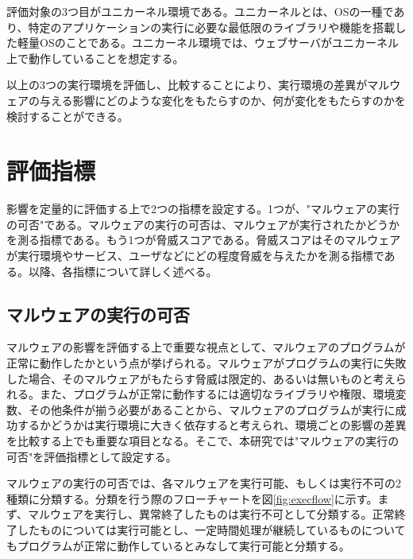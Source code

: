 \documentclass[12pt,a4paper,titlepage,report]{jsbook}
\begin{document}
評価対象の3つ目がユニカーネル環境である。ユニカーネルとは、OSの一種であり、特定のアプリケーションの実行に必要な最低限のライブラリや機能を搭載した軽量OSのことである。ユニカーネル環境では、ウェブサーバがユニカーネル上で動作していることを想定する。

以上の3つの実行環境を評価し、比較することにより、実行環境の差異がマルウェアの与える影響にどのような変化をもたらすのか、何が変化をもたらすのかを検討することができる。

\section{評価指標}
影響を定量的に評価する上で2つの指標を設定する。1つが、"マルウェアの実行の可否"である。マルウェアの実行の可否は、マルウェアが実行されたかどうかを測る指標である。もう1つが脅威スコアである。脅威スコアはそのマルウェアが実行環境やサービス、ユーザなどにどの程度脅威を与えたかを測る指標である。以降、各指標について詳しく述べる。

\subsection{マルウェアの実行の可否}
マルウェアの影響を評価する上で重要な視点として、マルウェアのプログラムが正常に動作したかという点が挙げられる。マルウェアがプログラムの実行に失敗した場合、そのマルウェアがもたらす脅威は限定的、あるいは無いものと考えられる。また、プログラムが正常に動作するには適切なライブラリや権限、環境変数、その他条件が揃う必要があることから、マルウェアのプログラムが実行に成功するかどうかは実行環境に大きく依存すると考えられ、環境ごとの影響の差異を比較する上でも重要な項目となる。そこで、本研究では"マルウェアの実行の可否"を評価指標として設定する。

マルウェアの実行の可否では、各マルウェアを実行可能、もしくは実行不可の2種類に分類する。分類を行う際のフローチャートを図\ref{fig:execflow}に示す。まず、マルウェアを実行し、異常終了したものは実行不可として分類する。正常終了したものについては実行可能とし、一定時間処理が継続しているものについてもプログラムが正常に動作しているとみなして実行可能と分類する。
\end{document}
